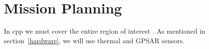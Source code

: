 \newpage
{}
\section{Mission Planning} \label{missionplanning}

In \gls{cpp} we must cover the entire region of interest \cite{cabreira2019cpp}. As mentioned in section~\ref{hardware}, we will use thermal and GPSAR sensors.